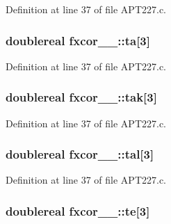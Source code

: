 Definition at line 37 of file A\+P\+T227.\+c.

\subsubsection[{\texorpdfstring{ta}{ta}}]{\setlength{\rightskip}{0pt plus 5cm}doublereal fxcor\+\_\+\_\+\+::ta\mbox{[}3\mbox{]}}\hypertarget{structfxcor__1___ac47ddb305386955f88ea14fb7672c783}{}\label{structfxcor__1___ac47ddb305386955f88ea14fb7672c783}


Definition at line 37 of file A\+P\+T227.\+c.

\subsubsection[{\texorpdfstring{tak}{tak}}]{\setlength{\rightskip}{0pt plus 5cm}doublereal fxcor\+\_\+\_\+\+::tak\mbox{[}3\mbox{]}}\hypertarget{structfxcor__1___a6c746139d56c895a094ced0f3d30bac0}{}\label{structfxcor__1___a6c746139d56c895a094ced0f3d30bac0}


Definition at line 37 of file A\+P\+T227.\+c.

\subsubsection[{\texorpdfstring{tal}{tal}}]{\setlength{\rightskip}{0pt plus 5cm}doublereal fxcor\+\_\+\_\+\+::tal\mbox{[}3\mbox{]}}\hypertarget{structfxcor__1___a9a2ff421a88a47ce236439b3126361c4}{}\label{structfxcor__1___a9a2ff421a88a47ce236439b3126361c4}


Definition at line 37 of file A\+P\+T227.\+c.

\subsubsection[{\texorpdfstring{te}{te}}]{\setlength{\rightskip}{0pt plus 5cm}doublereal fxcor\+\_\+\_\+\+::te\mbox{[}3\mbox{]}}\hypertarget{structfxcor__1___a54dcf6a6bd15ef6d197690b9ca457bad}{}\label{structfxcor__1___a54dcf6a6bd15ef6d197690b9ca457bad}


